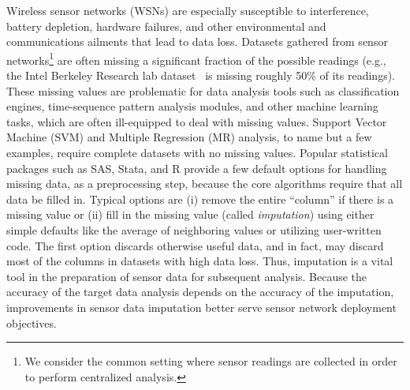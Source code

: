 
Wireless sensor networks (WSNs) are especially susceptible to interference,
battery depletion, hardware failures, and other environmental and communications ailments
that lead to data loss.  Datasets gathered from sensor networks\footnote{We consider the common setting where sensor readings are collected in order to perform centralized analysis.}
 are
often missing a significant fraction of the possible readings
(e.g., the Intel Berkeley Research lab dataset~\cite{berkeley2004lab}
is missing roughly 50\% of its readings).
These missing values are problematic for data analysis tools such as
classification engines, time-sequence pattern analysis modules, and
other machine learning tasks, which are often ill-equipped to deal
with missing values.  Support Vector Machine (SVM)
and Multiple Regression (MR) analysis,
to name but a few examples, require complete datasets with no missing
values.  Popular statistical packages such as SAS, Stata, and R
provide a few default options for handling missing data, as a
preprocessing step, because the core algorithms require that all data be filled
in.  Typical options are (i) remove the entire ``column'' if there is a
missing value or (ii) fill in the missing value (called {\em
imputation}) using either simple defaults like the average of
neighboring values or utilizing user-written code.  The first option discards
otherwise useful data, and in fact, may discard most of the columns in
datasets with high data loss.  Thus, imputation is a vital tool in the
preparation of sensor data for subsequent analysis. Because the
accuracy of the target data analysis depends on the accuracy of the
imputation, improvements in sensor data imputation better serve
sensor network deployment objectives.


